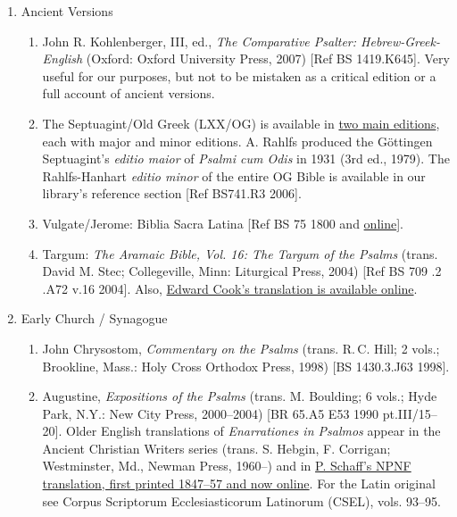 \documentclass[titlepage]{article}
\begin{document}
\begin{enumerate}

 \item Ancient Versions
  \begin{enumerate}

	\item John R. Kohlenberger, III, ed., \emph{The Comparative Psalter: Hebrew-Greek-English} (Oxford: Oxford University Press, 2007) [Ref BS 1419.K645]. Very useful for our purposes, but not to be mistaken as a critical edition or a full account of ancient versions.

	\item The Septuagint/Old Greek (LXX/OG) is available in \href{http://ccat.sas.upenn.edu/ioscs/editions.html}{two main editions}, each with major and minor editions. A. Rahlfs produced the Göttingen Septuagint's \emph{editio maior} of \emph{Psalmi cum Odis} in 1931 (3rd ed., 1979). The Rahlfs-Hanhart \emph{editio minor} of the entire OG Bible is available in our library's reference section [Ref BS741.R3 2006].

	\item Vulgate/Jerome: Biblia Sacra Latina [Ref BS 75 1800 and \href{https://www.biblegateway.com/versions/?action=getVersionInfo&vid=4}{online}].

	\item Targum: \emph{The Aramaic Bible, Vol. 16: The Targum of the Psalms} (trans. David M. Stec; Collegeville, Minn: Liturgical Press, 2004) [Ref BS 709 .2 .A72 v.16 2004]. Also, \href{http://targum.info/targumic-texts/targum-psalms/}{Edward Cook's translation is available online}.

  \end{enumerate}
 \item Early Church / Synagogue
  \begin{enumerate}

	\item John Chrysostom, \emph{Commentary on the Psalms} (trans. R.\,C. Hill; 2 vols.; Brookline, Mass.: Holy Cross Orthodox Press, 1998) [BS 1430.3.J63 1998].

	\item Augustine, \emph{Expositions of the Psalms} (trans. M. Boulding; 6 vols.; Hyde Park, N.Y.: New City Press, 2000--2004) [BR 65.A5 E53 1990 pt.III/15--20]. Older English translations of \emph{Enarrationes in Psalmos} appear in the Ancient Christian Writers series (trans. S. Hebgin, F. Corrigan; Westminster, Md., Newman Press, 1960--) and in \href{http://www.ccel.org/ccel/schaff/npnf108.toc.html}{P. Schaff's NPNF translation, first printed 1847--57 and now online}. For the Latin original see Corpus Scriptorum Ecclesiasticorum Latinorum (CSEL), vols. 93--95.


\end{enumerate}
\end{enumerate}
\end{document}
